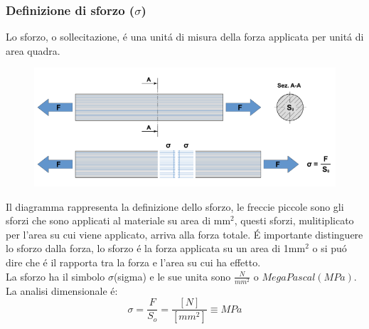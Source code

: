 \documentclass{article}
\begin{document}
            \subsubsection{Definizione di sforzo ($\sigma$)}
                Lo sforzo, o sollecitazione, \'e una unit\'a di misura della forza applicata per unit\'a di area quadra.
                \begin{figure}[!h]
                    \centering
                    \includegraphics[width=.85\linewidth]{Diagramma definizione dello sforzo.png}
                \end{figure}
                Il diagramma rappresenta la definizione dello sforzo, le freccie piccole sono gli sforzi che sono applicati al materiale su area di mm$^2$, questi sforzi, mulitiplicato per l'area su cui viene applicato, arriva alla forza totale. \'E importante distinguere lo sforzo dalla forza, lo sforzo \'e la forza applicata su un area di 1mm$^2$ o si pu\'o dire che \'e il rapporta tra la forza e l'area su cui ha effetto.\\
                La sforzo ha il simbolo $\sigma$(sigma) e le sue unita sono $\frac{N}{mm^2}$ o $MegaPascal (MPa)$.\\
                La analisi dimensionale \'e:
                \begin{equation*}
                    \sigma = \frac{F}{S_o} = \frac{[N]}{[mm^2]} \equiv MPa
                \end{equation*}
\end{document}
